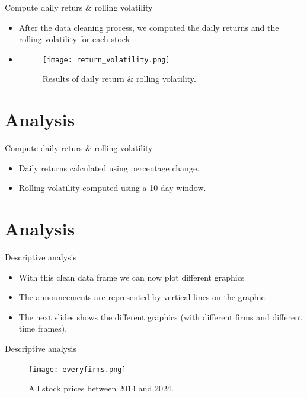 \documentclass{beamer}
\begin{document}

\begin{frame}{Compute daily returs \& rolling volatility}
  \begin{itemize}
      \item <1->After the data cleaning process, we computed the daily returns and the rolling volatility for each stock 
      \item <2->\begin{figure}
              \centering
              \texttt{[image: return\_volatility.png]}
              \caption{Results of daily return \& rolling volatility.}
              \label{fig:enter-label}
          \end{figure}
  \end{itemize}
\end{frame}

\section{Analysis}
\begin{frame}{Compute daily returs \& rolling volatility}
  \begin{itemize}
    \item Daily returns calculated using percentage change.
    \item Rolling volatility computed using a 10-day window.
   
  \end{itemize}
\end{frame}

\section{Analysis}
\begin{frame}{Descriptive analysis}
  \begin{itemize}
    \item <1->With this clean data frame we can now plot different graphics 
    \item <2->The announcements are represented by vertical lines on the graphic
    \item <3->The next slides shows the different graphics (with different firms and different time frames).
    
  \end{itemize}
\end{frame}

\begin{frame}{Descriptive analysis}
  
\begin{figure}
      \centering
      \texttt{[image: everyfirms.png]}
      \caption{All stock prices between 2014 and 2024.}
      \label{fig:enter-label}
  \end{figure}
    
\end{frame}
\end{document}
